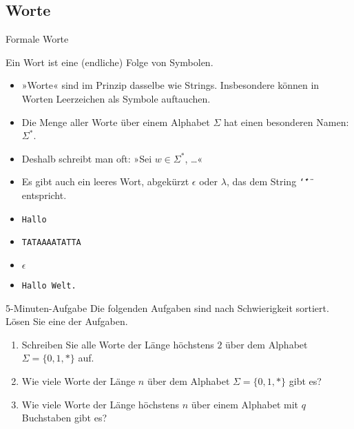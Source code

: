 \subsection{Worte}


\begin{frame}{Formale Worte}
  \begin{definition}[Wort]
    Ein \alert{Wort} ist eine (endliche) Folge von Symbolen. 
  \end{definition}
  \begin{itemize}
    \item »Worte« sind im Prinzip dasselbe wie
      Strings. Insbesondere können in Worten Leerzeichen als Symbole
      auftauchen.
    \item Die Menge aller Worte über einem Alphabet $\Sigma$ hat einen
      besonderen Namen: $\Sigma^*$.
    \item 
      Deshalb schreibt man oft: »Sei $w \in \Sigma^*$, \dots«
    \item Es gibt auch ein \alert{leeres Wort}, abgekürzt
      $\epsilon$ oder $\lambda$, das dem String
      \texttt{\char`\"\char`\"} entspricht. 
    \end{itemize}
   
  \begin{examples}
    \begin{itemize}
    \item \texttt{Hallo}
    \item \texttt{TATAAAATATTA}
    \item $\epsilon$
    \item \texttt{Hallo Welt.}
    \end{itemize}
  \end{examples} 
\end{frame}


\begin{frame}{5-Minuten-Aufgabe}
  Die folgenden Aufgaben sind nach Schwierigkeit sortiert. Lösen Sie
  \alert{eine} der Aufgaben. 
  \begin{enumerate}
  \item
    Schreiben Sie alle Worte der Länge höchstens $2$ über dem Alphabet
    $\Sigma = \{0,1,*\}$ auf.
  \item
    Wie viele Worte der Länge $n$ über dem Alphabet $\Sigma =
    \{0,1,*\}$  gibt es?
  \item
    Wie viele Worte der Länge höchstens $n$ über einem Alphabet mit
    $q$ Buchstaben gibt es?
  \end{enumerate}
\end{frame}



